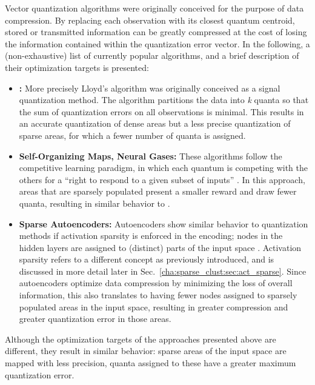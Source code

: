 			Vector quantization algorithms were originally conceived for the purpose of data compression.
			By replacing each observation with its closest quantum centroid, stored or transmitted information can be greatly compressed at the cost of losing the information contained within the quantization error vector.
			In the following, a (non-exhaustive) list of currently popular algorithms, and a brief description of their optimization targets is presented:
			\begin{itemize}
				\item 
					\textbf{\kmeans{}:} More precisely Lloyd's algorithm \cite{lloyd} was originally conceived as a signal quantization method.
					The \kmeans{} algorithm partitions the data into \textit{k} quanta so that the sum of quantization errors on all observations is minimal.
					This results in an accurate quantization of dense areas but a less precise quantization of sparse areas, for which a fewer number of quanta is assigned.
				
				\item 
					\textbf{Self-Organizing Maps, Neural Gases:} These algorithms follow the competitive learning paradigm, in which each quantum is competing with the others for a ``right to respond to a given subset of inputs'' \cite{complearn}.
					In this approach, areas that are sparsely populated present a smaller reward and draw fewer quanta, resulting in similar behavior to \kmeans{}.
				
				\item
					\textbf{Sparse Autoencoders:} Autoencoders show similar behavior to quantization methods if activation sparsity is enforced in the encoding; nodes in the hidden layers are assigned to (distinct) parts of the input space \cite{ksparse}.
					Activation sparsity refers to a different concept as previously introduced, and is discussed in more detail later in Sec.~\ref{cha:sparse_clust:sec:act_sparse}.
					Since autoencoders optimize data compression by minimizing the loss of overall information, this also translates to having fewer nodes assigned to sparsely populated areas in the input space, resulting in greater compression and greater quantization error in those areas.
			\end{itemize}
			\noindent Although the optimization targets of the approaches presented above are different, they result in similar behavior: sparse areas of the input space are mapped with less precision, quanta assigned to these have a greater maximum quantization error.
			
